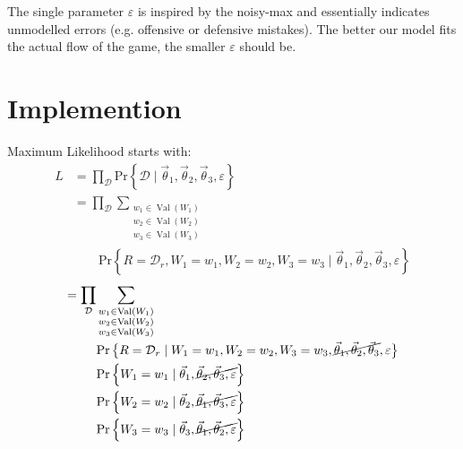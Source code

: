 \documentclass[10pt,twocolumn]{article}
\newcommand{\prb}[1]{\ensuremath{  \mathrm{Pr}\left\{ #1 \right\}  }}
\begin{document}
The single parameter $\varepsilon$ is inspired by the noisy-max and essentially indicates unmodelled errors (e.g. offensive or defensive mistakes).
The better our model fits the actual flow of the game, the smaller $\varepsilon$ should be.



\section{Implemention}

Maximum Likelihood starts with:
\begin{align*}
L &= \prod_{\mathcal{D}} \prb{\mathcal{D} \mid \vec \theta_1,\vec \theta_2,\vec \theta_3, \varepsilon}
\\ &=
\prod_{\mathcal{D}}
\sum_{\substack{w_1 \in \operatorname{Val}\left(W_1\right) \\ w_2 \in \operatorname{Val}\left(W_2\right) \\ w_3 \in \operatorname{Val}\left(W_3\right)}}
\\ & \quad \quad \prb{R = \mathcal{D}_r, W_1 = w_1, W_2 = w_2, W_3 = w_3 \mid \vec \theta_1,\vec \theta_2,\vec \theta_3, \varepsilon}
\end{align*}%
\begin{align*}
= \prod_{\mathcal{D}}
 & \sum_{\substack{w_1 \in \operatorname{Val}\left(W_1\right) \\ w_2 \in \operatorname{Val}\left(W_2\right) \\ w_3 \in \operatorname{Val}\left(W_3\right)}}
\\ & \prb{R = \mathcal{D}_r \mid W_1 = w_1, W_2 = w_2, W_3 = w_3, \cancel{ \vec \theta_1,\vec \theta_2,\vec \theta_3}, \varepsilon}
\\ & \prb{W_1 = w_1 \mid \vec \theta_1, \cancel{\vec \theta_2,\vec \theta_3, \varepsilon}}
\\ & \prb{W_2 = w_2 \mid \vec \theta_2, \cancel{\vec \theta_1,\vec \theta_3, \varepsilon}}
\\ & \prb{W_3 = w_3 \mid \vec \theta_3, \cancel{\vec \theta_1,\vec \theta_2, \varepsilon}}
\end{align*}%
\end{document}
